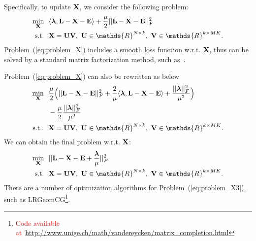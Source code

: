 \documentclass[letterpaper]{article}
\def\bE{{\bf E}}
\def\blambda{{\bm \lambda}}
\def\bL{{\bf L}}
\def\bU{{\bf U}}
\def\bV{{\bf V}}
\def\dsR{\mathds{R}}
\def\bX{{\bf X}}
\def\bX{{\bf X}}
\def\st{{\text{s.t.}}}
\def\yanred{\textcolor{red}}
\begin{document}
Specifically, to update $\bX$, we consider the following problem:
\begin{align}\label{eq:problem_X}
  \min_{\bX} ~&~ \langle \blambda, \bL - \bX - \bE \rangle + \frac{\mu}{2} || \bL - \bX - \bE ||_F^2  \nonumber  \\
  \st        ~&~ \bX = \bU \bV,~\bU \in \dsR^{N \times k},~\bV \in \dsR^{k \times MK}   .
\end{align}
Problem~(\ref{eq:problem_X}) includes a smooth loss function w.r.t. $\bX$, thus can be solved by a standard matrix factorization method, such as~\cite{yanijcai2015scalable,tanicml2014riemannian,vandereyckensiamjo2013low}.


Problem~(\ref{eq:problem_X}) can also be rewritten as below
\begin{align}\label{eq:problem_X2}
  \min_{\bX} ~&~ \frac{\mu}{2} \Big( || \bL - \bX - \bE ||_F^2 + \frac{2}{\mu} \langle \blambda, \bL - \bX - \bE \rangle + \frac{|| \blambda ||_F^2}{\mu^2} \Big)    \nonumber   \\
             ~&~ - \frac{\mu}{2} \frac{|| \blambda ||_F^2}{\mu^2}   \nonumber \\
  \st.       ~&~ \bX = \bU \bV,~\bU \in \dsR^{N \times k},~\bV \in \dsR^{k \times MK}   .
\end{align}
\noindent
We can obtain the final problem w.r.t. $\bX$:
\begin{align}\label{eq:problem_X3}
  \min_{\bX} ~&~ || \bL - \bX - \bE + \frac{\blambda}{\mu} ||_F^2   \nonumber \\
  \st        ~&~ \bX = \bU \bV,~\bU \in \dsR^{N \times k},~\bV \in \dsR^{k \times MK}   .
\end{align}
\noindent
There are a number of optimization algorithms for Problem~(\ref{eq:problem_X3}), such as LRGeomCG\footnote{\yanred{Code available at~\url{http://www.unige.ch/math/vandereycken/matrix_completion.html}}}.
\end{document}
